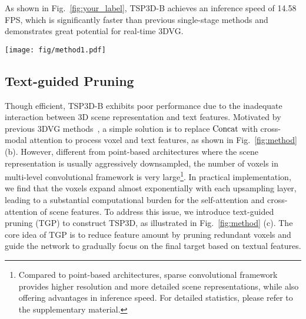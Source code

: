 As shown in Fig.~\ref{fig:your_label}, TSP3D-B achieves an inference speed of 14.58 FPS, which is significantly faster than previous single-stage methods and demonstrates great potential for real-time 3DVG. 



\begin{figure*}
	\centering
	\texttt{[image: fig/method1.pdf]}
    \vspace{-.1cm}
    \caption{Illustration of TSP3D. TSP3D bulids on multi-level sparse convolutional architecture. It iteratively upsamples the voxel features with text-guided pruning (TGP), and fuses multi-level features via completion-based addition (CBA). 
    (a) to (d) on the right side illustrate various options for feature upsampling. 
    (a) refers to simple concatenation with text features, which is fast but less accurate. 
    (b) refers to feature interaction through cross-modal attention mechanisms, which is constrained by the large number of voxels. 
    (c) represents our proposed TGP, which first prunes voxel features under textual guidance and thus enables efficient interaction between voxel and text features. 
    (d) shows a simplified version of TGP that removes farthest point sampling and interpolation, combines multi-modal feature interactions into a whole and moves it before pruning.}
	\label{fig:method}
	\vspace{-.2cm}
\end{figure*}


\subsection{Text-guided Pruning}\label{sec:3.2}
Though efficient, TSP3D-B exhibits poor performance due to the inadequate interaction between 3D scene representation and text features. Motivated by previous 3DVG methods~\citep{jain2022bottom}, a simple solution is to replace ${\rm Concat}$ with cross-modal attention to process voxel and text features, as shown in Fig.~\ref{fig:method} (b).
However, different from point-based architectures where the scene representation is usually aggressively downsampled, the number of voxels in multi-level convolutional framework is very large\footnote{Compared to point-based architectures, sparse convolutional framework provides higher resolution and more detailed scene representations, while also offering advantages in inference speed. For detailed statistics, please refer to the supplementary material.}. In practical implementation, we find that the voxels expand almost exponentially with each upsampling layer, leading to a substantial computational burden for the self-attention and cross-attention of scene features. To address this issue, we introduce text-guided pruning (TGP) to construct TSP3D, as illustrated in Fig.~\ref{fig:method} (c). The core idea of TGP is to reduce feature amount by pruning redundant voxels and guide the network to gradually focus on the final target based on textual features.



